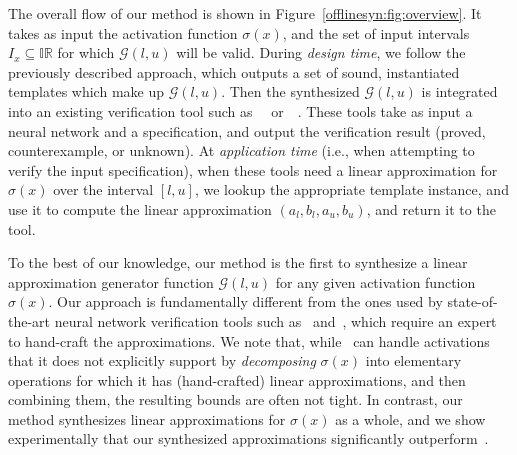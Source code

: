 The overall flow of our method is shown in Figure~\ref{offlinesyn:fig:overview}.
%
It takes as input the activation function $ \sigma(x) $, and the set of input
intervals $ I_x \subseteq \mathbb{IR} $ for which $ \mathcal{G}(l, u) $ will be
valid.
%
During \textit{design time}, we follow the previously described approach, which
outputs a set of sound, instantiated templates which make up $ \mathcal{G}(l,
u) $. Then the synthesized $ \mathcal{G}(l, u) $ is integrated into an existing
verification tool such as~\autolipra{}~\cite{autolipra}
or~\DeepPoly{}~\cite{SinghGPV19}.
These tools take as input a neural network and a specification, and output the
verification result (proved, counterexample, or unknown).
%
At \textit{application time} (i.e., when attempting to verify the input
specification), when these tools need a linear approximation for
$ \sigma(x) $ over the interval $ [l, u] $, we lookup the appropriate template
instance, and use it to compute the linear approximation $(a_l, b_l, a_u, b_u)$,
and return it to the tool.

To the best of our knowledge, our method is the first to synthesize a linear
approximation generator function $ \mathcal{G}(l, u) $ for any given activation function $ \sigma(x)
$. Our approach is fundamentally different from the ones used by state-of-the-art neural network verification tools such as~\autolipra{}
and~\DeepPoly{}, which require an expert to hand-craft the approximations. We
note that, while~\autolipra{} can handle activations that it does not
explicitly support by \textit{decomposing} $ \sigma(x) $ into
elementary operations for which it has (hand-crafted) linear approximations,
and then combining them, the resulting bounds are often not tight.
In contrast, our method synthesizes linear approximations for $
\sigma(x) $ as a whole, and we show experimentally that our synthesized
approximations significantly outperform~\autolipra{}.



